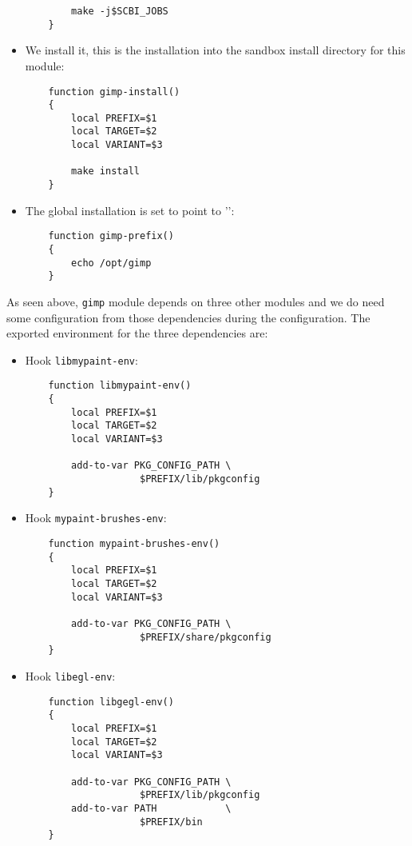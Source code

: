 \documentclass[a4paper,12pt,twoside]{article}
\newcommand{\code}[1]{\texttt{#1}}
\newcommand{\file}[1]{'{\path{#1}}'}
\begin{document}
\begin{itemize}
\begin{lstlisting}
		make -j$SCBI_JOBS
	}
	\end{lstlisting}

	\item We install it, this is the installation into the sandbox install directory for this module:

	\begin{lstlisting}
	function gimp-install()
	{
		local PREFIX=$1
		local TARGET=$2
		local VARIANT=$3

		make install
	}
	\end{lstlisting}

	\item The global installation is set to point to \file{/opt/gimp}:

	\begin{lstlisting}
	function gimp-prefix()
	{
		echo /opt/gimp
	}
	\end{lstlisting}

\end{itemize}

As seen above, \code{gimp} module depends on three other modules and we do need some configuration from those dependencies during the configuration. The exported environment for the three dependencies are:

\begin{itemize}
	\item Hook \code{libmypaint-env}:

	\begin{lstlisting}
	function libmypaint-env()
	{
		local PREFIX=$1
		local TARGET=$2
		local VARIANT=$3

		add-to-var PKG_CONFIG_PATH \
					$PREFIX/lib/pkgconfig
	}
	\end{lstlisting}

	\item Hook \code{mypaint-brushes-env}:

	\begin{lstlisting}
	function mypaint-brushes-env()
	{
		local PREFIX=$1
		local TARGET=$2
		local VARIANT=$3

		add-to-var PKG_CONFIG_PATH \
					$PREFIX/share/pkgconfig
	}
	\end{lstlisting}

	\item Hook \code{libegl-env}:

	\begin{lstlisting}
	function libgegl-env()
	{
		local PREFIX=$1
		local TARGET=$2
		local VARIANT=$3

		add-to-var PKG_CONFIG_PATH \
					$PREFIX/lib/pkgconfig
		add-to-var PATH            \
					$PREFIX/bin
	}
	\end{lstlisting}

\end{itemize}
\end{document}
